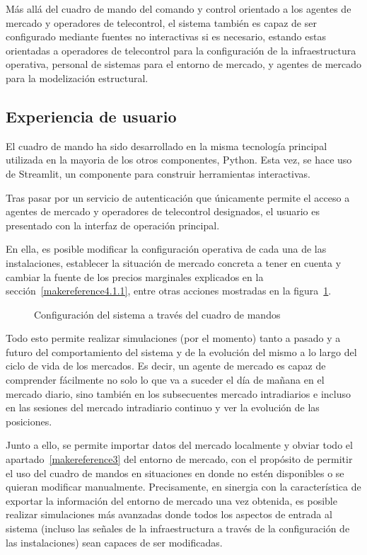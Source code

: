 Más allá del cuadro de mando del comando y control orientado a los agentes de mercado y operadores de telecontrol, el sistema también es capaz de ser configurado mediante fuentes no interactivas si es necesario, estando estas orientadas a operadores de telecontrol para la configuración de la infraestructura operativa, personal de sistemas para el entorno de mercado, y agentes de mercado para la modelización estructural.

\subsection{Experiencia de usuario}
\label{makereference6.2.1}

El cuadro de mando ha sido desarrollado en la misma tecnología principal utilizada en la mayoria de los otros componentes, Python. Esta vez, se hace uso de Streamlit, un componente para construir herramientas interactivas.

Tras pasar por un servicio de autenticación que únicamente permite el acceso a agentes de mercado y operadores de telecontrol designados, el usuario es presentado con la interfaz de operación principal.

En ella, es posible modificar la configuración operativa de cada una de las instalaciones, establecer la situación de mercado concreta a tener en cuenta y cambiar la fuente de los precios marginales explicados en la sección~\ref{makereference4.1.1}, entre otras acciones mostradas en la figura~\ref{fig:configuración-sistema}.

\begin{figure}
  \centering
  \caption{Configuración del sistema a través del cuadro de mandos}
  \label{fig:configuración-sistema}
\end{figure}

Todo esto permite realizar simulaciones (por el momento) tanto a pasado y a futuro del comportamiento del sistema y de la evolución del mismo a lo largo del ciclo de vida de los mercados. Es decir, un agente de mercado es capaz de comprender fácilmente no solo lo que va a suceder el día de mañana en el mercado diario, sino también en los subsecuentes mercado intradiarios e incluso en las sesiones del mercado intradiario continuo y ver la evolución de las posiciones.

Junto a ello, se permite importar datos del mercado localmente y obviar todo el apartado~\ref{makereference3} del entorno de mercado, con el propósito de permitir el uso del cuadro de mandos en situaciones en donde no estén disponibles o se quieran modificar manualmente. Precisamente, en sinergia con la característica de exportar la información del entorno de mercado una vez obtenida, es posible realizar simulaciones más avanzadas donde todos los aspectos de entrada al sistema (incluso las señales de la infraestructura a través de la configuración de las instalaciones) sean capaces de ser modificadas.

